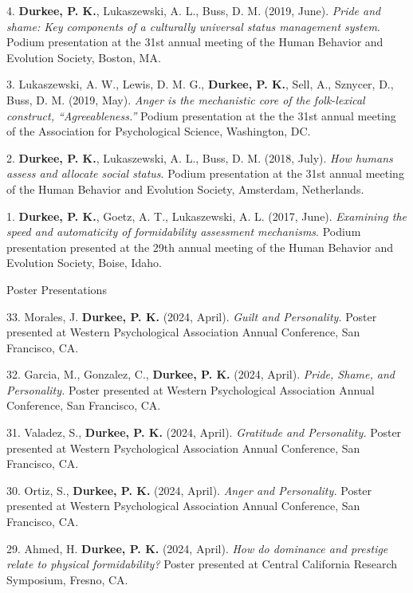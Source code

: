 \documentclass[10pt,]{article}
\begin{document}
4. \hangindent=0.5in \textbf{Durkee, P. K.}, Lukaszewski, A. L., Buss,
D. M. (2019, June). \emph{Pride and shame: Key components of a
culturally universal status management system}. Podium presentation at
the 31st annual meeting of the Human Behavior and Evolution Society,
Boston, MA.

3. \hangindent=0.5in Lukaszewski, A. W., Lewis, D. M. G.,
\textbf{Durkee, P. K.}, Sell, A., Sznycer, D., Buss, D. M. (2019, May).
\emph{Anger is the mechanistic core of the folk-lexical construct,
``Agreeableness.''} Podium presentation at the the 31st annual meeting
of the Association for Psychological Science, Washington, DC.

2. \hangindent=0.5in \textbf{Durkee, P. K.}, Lukaszewski, A. L., Buss,
D. M. (2018, July). \emph{How humans assess and allocate social status}.
Podium presentation at the 31st annual meeting of the Human Behavior and
Evolution Society, Amsterdam, Netherlands.

1. \hangindent=0.5in \textbf{Durkee, P. K.}, Goetz, A. T., Lukaszewski,
A. L. (2017, June). \emph{Examining the speed and automaticity of
formidability assessment mechanisms}. Podium presentation presented at
the 29th annual meeting of the Human Behavior and Evolution Society,
Boise, Idaho.

\textcolor{light-gray}{Poster Presentations}

33. \hangindent=0.5in Morales\textsuperscript{\faChevronCircleDown}, J.
\textbf{Durkee, P. K.} (2024, April). \emph{Guilt and Personality.}
Poster presented at Western Psychological Association Annual Conference,
San Francisco, CA.

32. \hangindent=0.5in Garcia\textsuperscript{\faChevronCircleDown}, M.,
Gonzalez\textsuperscript{\faChevronCircleDown}, C., \textbf{Durkee, P.
K.} (2024, April). \emph{Pride, Shame, and Personality.} Poster
presented at Western Psychological Association Annual Conference, San
Francisco, CA.

31. \hangindent=0.5in Valadez\textsuperscript{\faChevronCircleDown}, S.,
\textbf{Durkee, P. K.} (2024, April). \emph{Gratitude and Personality.}
Poster presented at Western Psychological Association Annual Conference,
San Francisco, CA.

30. \hangindent=0.5in Ortiz\textsuperscript{\faChevronCircleDown}, S.,
\textbf{Durkee, P. K.} (2024, April). \emph{Anger and Personality.}
Poster presented at Western Psychological Association Annual Conference,
San Francisco, CA.

29. \hangindent=0.5in Ahmed\textsuperscript{\faChevronCircleDown}, H.
\textbf{Durkee, P. K.} (2024, April). \emph{How do dominance and
prestige relate to physical formidability?} Poster presented at Central
California Research Symposium, Fresno, CA.
\end{document}
